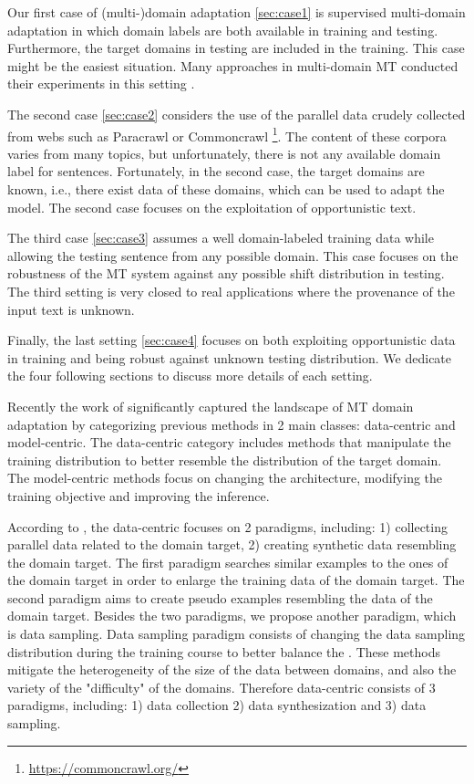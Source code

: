 Our first case of (multi-)domain adaptation \ref{sec:case1} is supervised multi-domain adaptation in which domain labels are both available in training and testing. Furthermore, the target domains in testing are included in the training. This case might be the easiest situation. Many approaches in multi-domain MT conducted their experiments in this setting \cite{Pham21revisiting}. 

The second case \ref{sec:case2} considers the use of the parallel data crudely collected from webs such as Paracrawl \citep{Banon20Paracrawl} or Commoncrawl \footnote{\url{https://commoncrawl.org/}}. The content of these corpora varies from many topics, but unfortunately, there is not any available domain label for sentences. Fortunately, in the second case, the target domains are known, i.e., there exist data of these domains, which can be used to adapt the model. The second case focuses on the exploitation of opportunistic text. 

The third case \ref{sec:case3} assumes a well domain-labeled training data while allowing the testing sentence from any possible domain. This case focuses on the robustness of the MT system against any possible shift distribution in testing. The third setting is very closed to real applications where the provenance of the input text is unknown. 

Finally, the last setting \ref{sec:case4} focuses on both exploiting opportunistic data in training and being robust against unknown testing distribution. We dedicate the four following sections to discuss more details of each setting.

Recently the work of \citet{Chu18survey} significantly captured the landscape of MT domain adaptation by categorizing previous methods in 2 main classes: data-centric and model-centric. The data-centric category includes methods that manipulate the training distribution to better resemble the distribution of the target domain. The model-centric methods focus on changing the architecture, modifying the training objective and improving the inference.

According to \citet{Chu18asurvey}, the data-centric focuses on 2 paradigms, including: 1) collecting parallel data related to the domain target, 2) creating synthetic data resembling the domain target. The first paradigm searches similar examples to the ones of the domain target in order to enlarge the training data of the domain target. The second paradigm aims to create pseudo examples resembling the data of the domain target. Besides the two paradigms, we propose another paradigm, which is data sampling. Data sampling paradigm consists of changing the data sampling distribution during the training course to better balance the . These methods mitigate the heterogeneity of the size of the data between domains, and also the variety of the "difficulty" of the domains. Therefore data-centric consists of 3 paradigms, including: 1) data collection 2) data synthesization and 3) data sampling.

